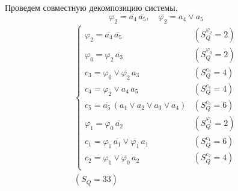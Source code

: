 \documentclass{article}
\begin{document}
\noindent\begin{minipage}{\textwidth}
Проведем совместную декомпозицию системы. \[\varphi_{2} = \overline{a_4}\,\overline{a_5}, \quad \overline{\varphi_{2}} = a_4 \lor a_5\]
\[\begin{matrix}
    \begin{cases}
        \varphi_{2} = \overline{a_4}\,\overline{a_5} & (S_Q^{\varphi_{2}} = 2) \\
        \varphi_{0} = \varphi_{2}\,\overline{a_3} & (S_Q^{\varphi_{0}} = 2) \\
        c_3 = \varphi_{0} \lor \overline{\varphi_{2}}\,a_3 & (S_Q^{c_3} = 4) \\
        c_4 = \varphi_{2} \lor a_4\,a_5 & (S_Q^{c_4} = 4) \\
        c_5 = \overline{a_5}\,\left(a_1 \lor a_2 \lor a_3 \lor a_4\right) & (S_Q^{c_5} = 6) \\
        \varphi_{1} = \varphi_{0}\,\overline{a_2} & (S_Q^{\varphi_{1}} = 2) \\
        c_1 = \varphi_{1}\,\overline{a_1} \lor \overline{\varphi_{1}}\,a_1 & (S_Q^{c_1} = 6) \\
        c_2 = \varphi_{1} \lor \overline{\varphi_{0}}\,a_2 & (S_Q^{c_2} = 4) \\
    \end{cases} \\ (S_Q = 33)
\end{matrix}\] \\ \phantom{0}
\end{minipage}
\clearpage
\end{document}
